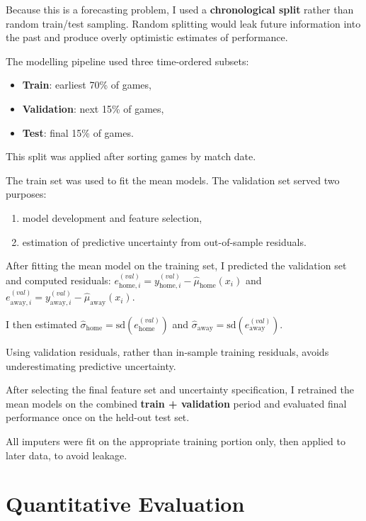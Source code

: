 \documentclass{article}
\begin{document}
Because this is a forecasting problem, I used a \textbf{chronological split} rather than random train/test sampling. Random splitting would leak future information into the past and produce overly optimistic estimates of performance.

The modelling pipeline used three time-ordered subsets:
\begin{itemize}
    \item \textbf{Train}: earliest 70\% of games,
    \item \textbf{Validation}: next 15\% of games,
    \item \textbf{Test}: final 15\% of games.
\end{itemize}

This split was applied after sorting games by match date.

The train set was used to fit the mean models. The validation set served two purposes:
\begin{enumerate}
    \item model development and feature selection,
    \item estimation of predictive uncertainty from out-of-sample residuals.
\end{enumerate}

After fitting the mean model on the training set, I predicted the validation set and computed residuals:
$
e^{(val)}_{\text{home},i} = y^{(val)}_{\text{home},i} - \hat{\mu}_{\text{home}}(x_i)
$
and
$
e^{(val)}_{\text{away},i} = y^{(val)}_{\text{away},i} - \hat{\mu}_{\text{away}}(x_i).
$

I then estimated
$
\hat{\sigma}_{\text{home}} = \mathrm{sd}\!\left(e^{(val)}_{\text{home}}\right)
$
and
$
\hat{\sigma}_{\text{away}} = \mathrm{sd}\!\left(e^{(val)}_{\text{away}}\right).
$

Using validation residuals, rather than in-sample training residuals, avoids underestimating predictive uncertainty.

After selecting the final feature set and uncertainty specification, I retrained the mean models on the combined \textbf{train + validation} period and evaluated final performance once on the held-out test set.

All imputers were fit on the appropriate training portion only, then applied to later data, to avoid leakage.

\section{Quantitative Evaluation}
\end{document}
